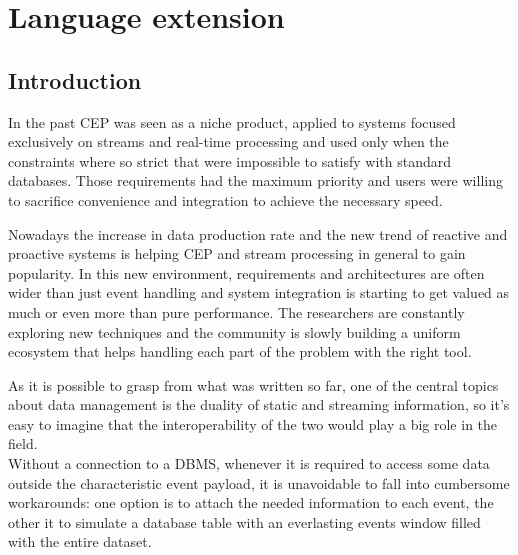 \chapter{Language extension}

\section{Introduction}
In the past CEP was seen as a niche product, applied to systems focused exclusively on streams and real-time processing and used only when the constraints where so strict that were impossible to satisfy with standard databases. Those requirements had the maximum priority and users were willing to sacrifice convenience and integration to achieve the necessary speed.

Nowadays the increase in data production rate and the new trend of reactive and proactive systems is helping CEP and stream processing in general to gain popularity. In this new environment, requirements and architectures are often wider than just event handling and system integration is starting to get valued as much or even more than pure performance. The researchers are constantly exploring new techniques and the community is slowly building a uniform ecosystem that helps handling each part of the problem with the right tool.

As it is possible to grasp from what was written so far, one of the central topics about data management is the duality of static and streaming information, so it's easy to imagine that the interoperability of the two would play a big role in the field.\\
Without a connection to a DBMS, whenever it is required to access some data outside the characteristic event payload, it is unavoidable to fall into cumbersome workarounds: one option is to attach the needed information to each event, the other it to simulate a database table with an everlasting events window filled with the entire dataset.

